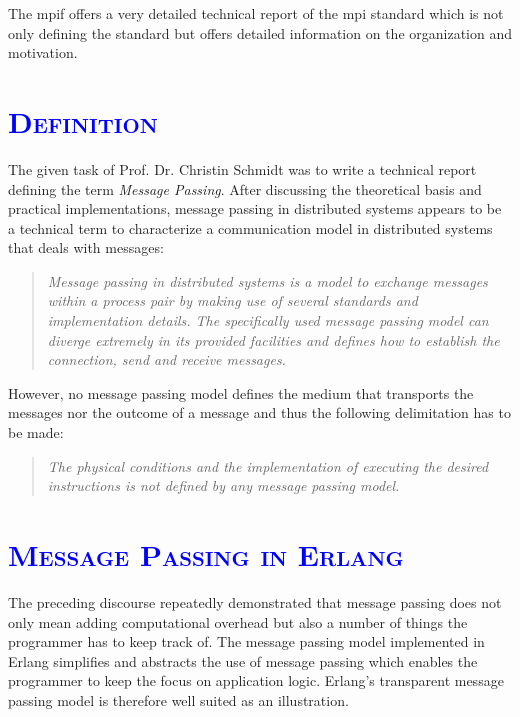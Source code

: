 \documentclass[xcolor=dvipsnames]{article}
\begin{document}
\noindent The \gls{mpif} offers a very detailed technical report \cite{mpi} of the \gls{mpi} standard which is not only defining the standard but offers detailed information on the organization and motivation.

\section{\scshape{\textcolor{blue}{Definition}}}

The given task of Prof. Dr. Christin Schmidt was to write a technical report defining the term \textit{Message Passing}. After discussing the theoretical basis and practical implementations, message passing in distributed systems appears to be a technical term to characterize a communication model in distributed systems that deals with messages:

\begin{quote}
\textit{Message passing in distributed systems is a model to exchange messages within a process pair by making use of several standards and implementation details. The specifically used message passing model can diverge extremely in its provided facilities and defines how to establish the connection, send and receive messages.}
\end{quote}

\noindent However, no message passing model defines the medium that transports the messages nor the outcome of a message and thus the following delimitation has to be made:

\begin{quote}
\textit{The physical conditions and the implementation of executing the desired instructions is not defined by any message passing model.}
\end{quote}

\section{\scshape{\textcolor{blue}{Message Passing in Erlang}}} \label{erlang}

The preceding discourse repeatedly demonstrated that message passing does not only mean adding computational overhead but also a number of things the programmer has to keep track of. The message passing model implemented in Erlang simplifies and abstracts the use of message passing which enables the programmer to keep the focus on application logic. Erlang's transparent message passing model is therefore well suited as an illustration.
\end{document}
